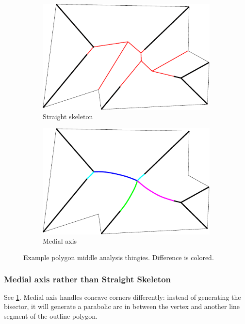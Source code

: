 \begin{figure}
\begin{subfigure}{0.45\columnwidth}
\includegraphics[width=\columnwidth]{sources/method/example_straight_skeleton.pdf}
\caption{Straight skeleton}
\end{subfigure}
\begin{subfigure}{0.45\columnwidth}
\includegraphics[width=\columnwidth]{sources/method/example_medial_axis.pdf}
\caption{Medial axis}
\end{subfigure}
\caption{Example polygon middle analysis thingies. Difference is colored.}
\label{medial_axis_vs_straight_skeleton}
\end{figure}


\subsubsection{Medial axis rather than Straight Skeleton}
See \cref{medial_axis_vs_straight_skeleton}.
Medial axis handles concave corners differently:
instead of generating the bisector, it will generate a parabolic arc in between the vertex and another line segment of the outline polygon.

